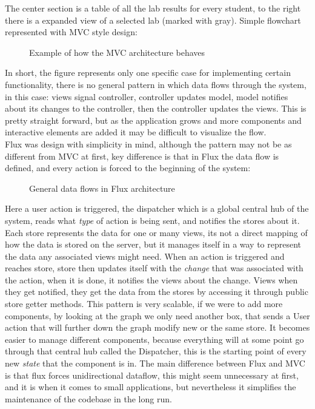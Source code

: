 The center section is a table of all the lab results for every student, to the right there is a expanded view of a selected lab (marked with gray).
Simple flowchart represented with MVC style design:

\begin{figure}[h]
\centering

\caption{Example of how the MVC architecture behaves}
\end{figure}

In short, the figure represents only one specific case for implementing certain functionality, there is no general pattern in which data flows through the system, in this case: views signal controller, controller updates model, model notifies about its changes to the controller, then the controller updates the views. This is pretty straight forward, but as the application grows and more components and interactive elements are added it may be difficult to visualize the flow.
\\Flux was design with simplicity in mind, although the pattern may not be as different from MVC at first, key difference is that in Flux the data flow is defined, and every action is forced to the beginning of the system:

\begin{figure}[h]
\centering
\scalebox{0.9}{}
\caption{General data flows in Flux architecture}
\end{figure}

Here a user action is triggered, the dispatcher which is a global central hub of the system, reads what \emph{type} of action is being sent, and notifies the stores about it. Each store represents the data for one or many views, its not a direct mapping of how the data is stored on the server, but it manages itself in a way to represent the data any associated views might need. When an action is triggered and reaches store, store then updates itself with the \emph{change} that was associated with the action, when it is done, it notifies the views about the change. Views when they get notified, they get the data from the stores by accessing it through public store getter methods.
This pattern is very scalable, if we were to add more components, by looking at the graph we only need another box, that sends a User action that will further down the graph modify new or the same store. It becomes easier to manage different components, because everything will at some point go through that central hub called the Dispatcher, this is the starting point of every new \emph{state} that the component is in. The main difference between Flux and MVC is that flux forces unidirectional dataflow, this might seem unnecessary at first, and it is when it comes to small applications, but nevertheless it simplifies the maintenance of the codebase in the long run.


